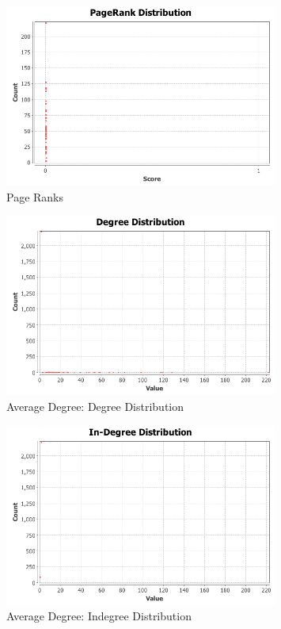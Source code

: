 \documentclass[letterpaper,11pt]{article}
\begin{document}
\begin{figure}[!ht]
\centering
\includegraphics[width=0.8\textwidth]{Q3/PageRank/pageranks.png}
\caption{Page Ranks}
\label{fig:Page Ranks}
\end{figure}

\begin{figure}[!ht]
\centering
\includegraphics[width=0.8\textwidth]{Q3/AverageDegree/degree-distribution.png}
\caption{Average Degree: Degree Distribution}
\label{fig:Average Degree: Degree distribution}
\end{figure}

\begin{figure}[!ht]
\centering
\includegraphics[width=0.8\textwidth]{Q3/AverageDegree/indegree-distribution.png}
\caption{Average Degree: Indegree Distribution}
\label{fig:Average Degree: Indegree distribution}
\end{figure}
\end{document}

